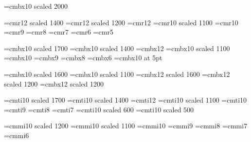 
%

\def\Font #1@#2pt{\font\Fonteol=ec#1 at #2pt\Fonteol}

\font\LD@Font@Book=cmbx10 scaled 2000\relax 
%
% 
%
%

% 

\font\seventeenrm=cmr12 scaled 1400
\font\fourteenrm=cmr12 scaled 1200
\font\twelverm=cmr12
\font\elevenrm=cmr10 scaled 1100
\font\tenrm=cmr10
\font\ninerm=cmr9
\font\eightrm=cmr8
\font\sevenrm=cmr7
\font\sixrm=cmr6
\font\fiverm=cmr5

% 

\font\seventeenbf=cmbx10 scaled 1700
\font\fourteenbf=cmbx10 scaled 1400
\font\twelvebf=cmbx12
\font\elevenbf=cmbx10 scaled 1100
\font\tenbf=cmbx10
\font\ninebf=cmbx9
\font\eightbf=cmbx8
\font\sixbf=cmbx6
\font\fivebf=cmbx10 at 5pt

\font\chiffre=cmbx10 scaled 1600
\font\gras=cmbx10 scaled 1100             %
\font\TIT=cmbx12 scaled 1600              %
\font\titre=cmbx12 scaled 1200
\font\pti=cmbx12 scaled 1200

% 

\font\seventeenit=cmti10 scaled 1700
\font\fourteenit=cmti10 scaled 1400
\font\twelveit=cmti12
\font\elevenit=cmti10 scaled 1100
\font\tenit=cmti10
\font\nineit=cmti9
\font\eightit=cmti8
\font\sevenit=cmti7
\font\sixit=cmti10 scaled 600
\font\fiveit=cmti10 scaled 500

% 

\font\twelvei=cmmi10 scaled 1200
\font\eleveni=cmmi10 scaled 1100
\font\teni=cmmi10
\font\ninei=cmmi9
\font\eighti=cmmi8
\font\seveni=cmmi7
\font\sixi=cmmi6

